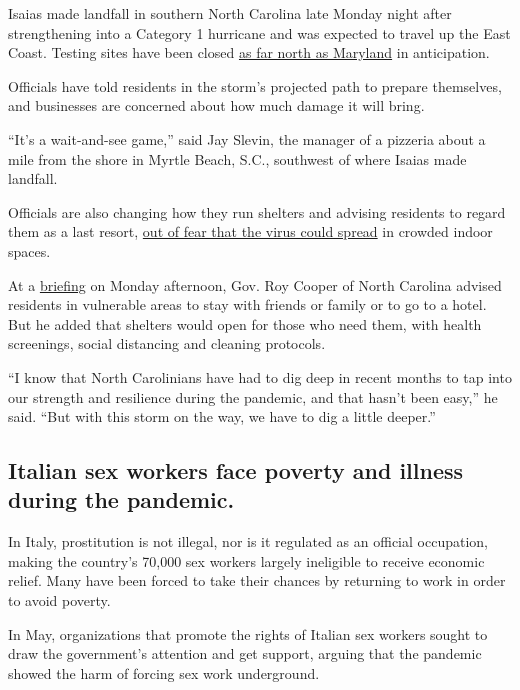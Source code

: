 Isaias made landfall in southern North Carolina late Monday night after
strengthening into a Category 1 hurricane and was expected to travel up
the East Coast. Testing sites have been closed
\href{https://patch.com/maryland/baltimore/tropical-storm-isaias-closes-14-md-coronavirus-testing-sites}{as
far north as Maryland} in anticipation.

Officials have told residents in the storm's projected path to prepare
themselves, and businesses are concerned about how much damage it will
bring.

``It's a wait-and-see game,'' said Jay Slevin, the manager of a pizzeria
about a mile from the shore in Myrtle Beach, S.C., southwest of where
Isaias made landfall.

Officials are also changing how they run shelters and advising residents
to regard them as a last resort,
\href{https://www.nytimes.com/2020/07/26/us/virus-texas-storm.html}{out
of fear that the virus could spread} in crowded indoor spaces.

At a
\href{https://www.ncdps.gov/storm-update?fbclid=IwAR3gtINKPXqQdsJixuf1kwBKbAtEMz62wzyoDHlu7FDBN1HTarDlw8FlVwQ}{briefing}
on Monday afternoon, Gov. Roy Cooper of North Carolina advised residents
in vulnerable areas to stay with friends or family or to go to a hotel.
But he added that shelters would open for those who need them, with
health screenings, social distancing and cleaning protocols.

``I know that North Carolinians have had to dig deep in recent months to
tap into our strength and resilience during the pandemic, and that
hasn't been easy,'' he said. ``But with this storm on the way, we have
to dig a little deeper.''

\hypertarget{italian-sex-workers-face-poverty-and-illness-during-the-pandemic}{%
\subsection{Italian sex workers face poverty and illness during the
pandemic.}\label{italian-sex-workers-face-poverty-and-illness-during-the-pandemic}}

In Italy, prostitution is not illegal, nor is it regulated as an
official occupation, making the country's 70,000 sex workers largely
ineligible to receive economic relief. Many have been forced to take
their chances by returning to work in order to avoid poverty.

In May, organizations that promote the rights of Italian sex workers
sought to draw the government's attention and get support, arguing that
the pandemic showed the harm of forcing sex work underground.

